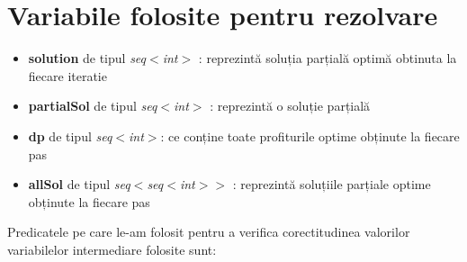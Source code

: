 \section{Variabile folosite pentru rezolvare}
\begin{itemize}
    \item \textbf{solution} de tipul \textit{seq$<$int$>$} : reprezintă soluția parțială optimă obtinuta la fiecare iteratie
    \item \textbf{partialSol} de tipul \textit{seq$<$int$>$} : reprezintă o soluție parțială
    \item \textbf{dp} de tipul \textit{seq$<$int$>$}:
    ce conține toate profiturile optime obținute la fiecare pas
    \item \textbf{allSol} de tipul \textit{seq$<$seq$<$int$>$$>$} : reprezintă soluțiile parțiale optime obținute la fiecare pas
   
\end{itemize}

Predicatele pe care le-am folosit pentru a verifica corectitudinea valorilor variabilelor intermediare folosite sunt: 

